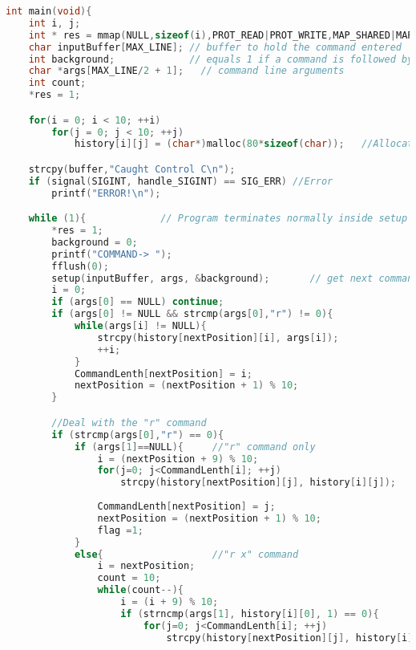 \documentclass[12pt,a4paper]{article}
\begin{document}
\begin{lstlisting}[language=C]
int main(void){
    int i, j;
    int * res = mmap(NULL,sizeof(i),PROT_READ|PROT_WRITE,MAP_SHARED|MAP_ANONYMOUS,-1,0);
    char inputBuffer[MAX_LINE]; // buffer to hold the command entered 
    int background;             // equals 1 if a command is followed by '&' 
    char *args[MAX_LINE/2 + 1];   // command line arguments 
    int count;
    *res = 1;

    for(i = 0; i < 10; ++i)
        for(j = 0; j < 10; ++j)
            history[i][j] = (char*)malloc(80*sizeof(char));   //Allocate the memory

    strcpy(buffer,"Caught Control C\n");
    if (signal(SIGINT, handle_SIGINT) == SIG_ERR) //Error
        printf("ERROR!\n");

    while (1){             // Program terminates normally inside setup
        *res = 1;
        background = 0;
        printf("COMMAND-> ");
        fflush(0);
        setup(inputBuffer, args, &background);       // get next command
        i = 0;
        if (args[0] == NULL) continue;
        if (args[0] != NULL && strcmp(args[0],"r") != 0){
            while(args[i] != NULL){
                strcpy(history[nextPosition][i], args[i]);
                ++i;
            }
            CommandLenth[nextPosition] = i;
            nextPosition = (nextPosition + 1) % 10;
        }

        //Deal with the "r" command
        if (strcmp(args[0],"r") == 0){
            if (args[1]==NULL){     //"r" command only
                i = (nextPosition + 9) % 10;
                for(j=0; j<CommandLenth[i]; ++j)
                    strcpy(history[nextPosition][j], history[i][j]);
                
                CommandLenth[nextPosition] = j;
                nextPosition = (nextPosition + 1) % 10;
                flag =1;
            }
            else{                   //"r x" command
                i = nextPosition;
                count = 10;
                while(count--){
                    i = (i + 9) % 10;
                    if (strncmp(args[1], history[i][0], 1) == 0){
                        for(j=0; j<CommandLenth[i]; ++j)
                            strcpy(history[nextPosition][j], history[i][j]);
                            

\end{lstlisting}
\end{document}
